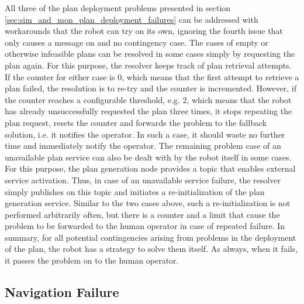 \documentclass[english, master, utf8]{base/thesis_KBS}
\newcommand{\code}{\collectverb{\codebox}}
\begin{document}
All three of the plan deployment problems presented in section \ref{sec:sim_and_mon_plan_deployment_failures} can be addressed with workarounds that the robot can try
on its own, ignoring the fourth issue that only causes a message on \code{/robot_info} and no contingency case. The cases of empty or otherwise infeasible plans can be resolved
in some cases simply by requesting the plan again. For this purpose, the resolver keeps track of plan retrieval attempts. If the counter for either case is $0$, which means that the
first attempt to retrieve a plan failed, the resolution is to re-try and the counter is incremented. However, if the counter reaches a configurable threshold, e.g. $2$, which means
that the robot has already unsuccessfully requested the plan three times, it stops repeating the plan request, resets the counter and forwards the problem to the fallback solution,
i.e. it notifies the operator. In such a case, it should waste no further time and immediately notify the operator. The remaining problem case of an unavailable plan service can also
be dealt with by the robot itself in some cases. For this purpose, the plan generation node provides a topic \code{/activate_plan_service} that enables external service activation.
Thus, in case of an unavailable service failure, the resolver simply publishes on this topic and initiates a re-initialization of the plan generation service. Similar to the two
cases above, such a re-initialization is not performed arbitrarily often, but there is a counter and a limit that cause the problem to be forwarded to the human operator in case of
repeated failure. In summary, for all potential contingencies arising from problems in the deployment of the plan, the robot has a strategy to solve them itself. As always, when it
fails, it passes the problem on to the human operator.

\subsection{Navigation Failure}
\label{sec:nav_fail_resolver}
\end{document}
